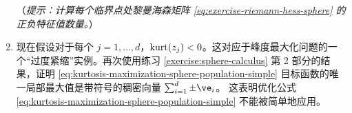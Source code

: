 \documentclass[../../book-main.tex]{subfiles}
\begin{document}
\begin{exercise}
\begin{enumerate}
        （\textit{提示：计算每个临界点处黎曼海森矩阵 \eqref{eq:exercise-riemann-hess-sphere} 的正负特征值数量。}）
        \item 现在假设对于每个 $j =1, \dots, d$，$\mathop{\mathrm{kurt}}(z_j) < 0$。这对应于峰度最大化问题的一个“过度紧缩”实例。再次使用练习 \ref{exercise:sphere-calculus} 第 2 部分的结果，证明 \eqref{eq:kurtosis-maximization-sphere-population-simple} 目标函数的唯一局部最大值是带符号的稠密向量 $\sum_{i=1}^d \pm \ve_i$。
        这表明优化公式 \eqref{eq:kurtosis-maximization-sphere-population-simple} 不能被简单地应用。
    \end{enumerate}
\end{exercise}


\end{document}
